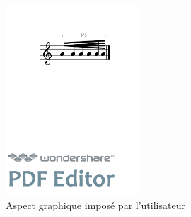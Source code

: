 \documentclass[a4paper,10pt,twocolumn]{article}
\newenvironment{code}
  {\fontfamily{pnc}\selectfont}{}
\begin{document}

\begin{figure}[h]
\centering
\begin{code}
[ \textbackslash{}fBeam\textless{}durations="1/16,1/64", drawDuration="true"\textgreater{}(a/8 a/16 a a a/32 a) ]
\end{code}

\includegraphics[width=5cm]{img/durations.pdf}
\caption{Aspect graphique imposé par l'utilisateur}
\label{fig:utilisateur}
\end{figure}
\end{document}
